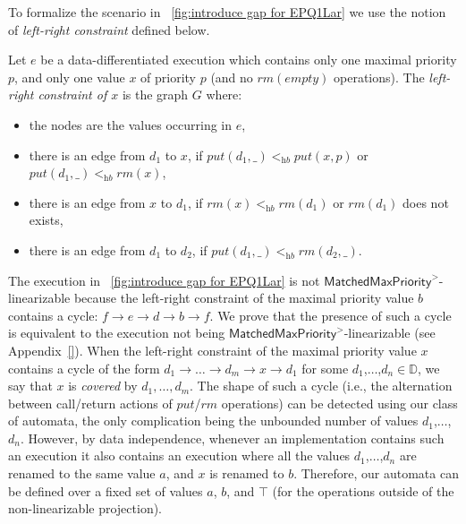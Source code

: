 To formalize the scenario in \figurename~\ref{fig:introduce gap for EPQ1Lar} we use the notion of \emph{left-right constraint} defined below.

\begin{definition}\label{def:left-right constraint for matched put and rm operations}
Let $e$ be a data-differentiated execution which contains only one maximal priority $p$, and only one value $x$ of priority $p$ (and no $\textit{rm}(\textit{empty})$ operations).
The \emph{left-right constraint of $x$} is the graph $G$ where: %
\begin{itemize}
\item the nodes are the values occurring in $e$, %
\item there is an edge from $d_1$ to $x$, if $\textit{put}(d_1,\_) <_{\textit{hb}} \textit{put}(x,p)$ or $\textit{put}(d_1,\_) <_{\textit{hb}} \textit{rm}(x)$,
\item there is an edge from $x$ to $d_1$, if $\textit{rm}(x)<_{\textit{hb}}\textit{rm}(d_1)$ or $\textit{rm}(d_1)$ does not exists,
\item there is an edge from $d_1$ to $d_2$, if $\textit{put}(d_1,\_) <_{\textit{hb}} \textit{rm}(d_2,\_)$.
\end{itemize}
\end{definition}

The execution in \figurename~\ref{fig:introduce gap for EPQ1Lar} is not $\mathsf{MatchedMaxPriority}^>$-linearizable because the left-right constraint of the maximal priority value $b$ contains a cycle: $f \rightarrow e \rightarrow d \rightarrow b \rightarrow f$. We prove that the presence of such a cycle is equivalent to the execution not being $\mathsf{MatchedMaxPriority}^>$-linearizable (see Appendix~\ref{}).
When the left-right constraint of the maximal priority value $x$ contains a cycle of the form $d_1 \rightarrow \ldots \rightarrow d_m \rightarrow x \rightarrow d_1$ for some $d_1$,$\ldots$,$d_n\in \mathbb{D}$, we say that $x$ is \emph{covered} by $d_1,\ldots,d_m$. The shape of such a cycle (i.e., the alternation between call/return actions of $\textit{put}$/$\textit{rm}$ operations) can be detected using our class of automata, the only complication being the unbounded number of values $d_1$,$\ldots$,$d_n$. However, by data independence, whenever an implementation contains such an execution it also contains an execution where all the values $d_1$,$\ldots$,$d_n$ are renamed to the same value $a$, and $x$ is renamed to $b$. Therefore, our automata can be defined over a fixed set of values $a$, $b$, and $\top$ (for the operations outside of the non-linearizable projection).

